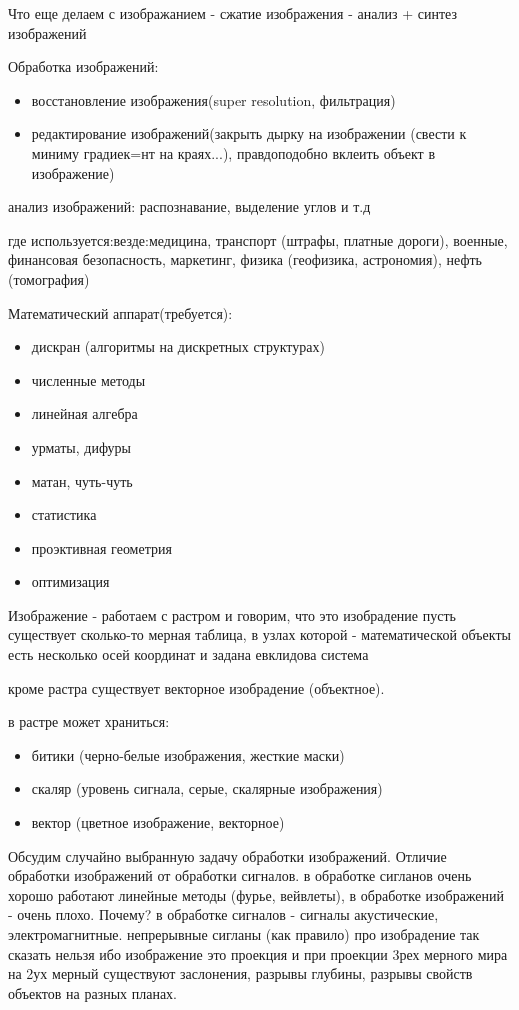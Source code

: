 \documentclass[]{report}
\begin{document}
Что еще делаем с изображанием - сжатие изображения - анализ + синтез изображений

Обработка изображений:
\begin{itemize}
	\item восстановление изображения(super resolution, фильтрация)
	\item редактирование изображений(закрыть дырку на изображении (свести к миниму градиек=нт на краях...), правдоподобно вклеить объект в изображение)
\end{itemize}

анализ изображений: распознавание, выделение углов и т.д

где используется:везде:медицина, транспорт (штрафы, платные дороги), военные, финансовая безопасность, маркетинг, физика (геофизика, астрономия), нефть (томография)

Математический аппарат(требуется):
\begin{itemize}
	\item дискран (алгоритмы на дискретных структурах)
	\item численные методы
	\item линейная алгебра
	\item урматы, дифуры
	\item матан, чуть-чуть
	\item статистика
	\item проэктивная геометрия
	\item оптимизация
\end{itemize}

Изображение - работаем с растром и говорим, что это изобрадение
пусть существует сколько-то мерная таблица, в узлах которой - математической объекты
есть несколько осей координат и задана евклидова система

кроме растра существует векторное изобрадение (объектное). 

в растре может храниться:
\begin{itemize}
	\item битики (черно-белые изображения, жесткие маски)
	\item скаляр (уровень сигнала, серые, скалярные изображения)
	\item вектор (цветное изображение, векторное)
\end{itemize}

Обсудим случайно выбранную задачу обработки изображений.
Отличие обработки изображений от обработки сигналов.
в обработке сигланов очень хорошо работают линейные методы (фурье, вейвлеты), в обработке изображений - очень плохо.
Почему?
в обработке сигналов - сигналы акустические, электромагнитные. непрерывные сигланы (как правило)
про изобрадение так сказать нельзя
ибо изображение это проекция и при проекции 3рех мерного мира на 2ух мерный существуют заслонения, разрывы глубины, разрывы свойств объектов на разных планах.
\end{document}
